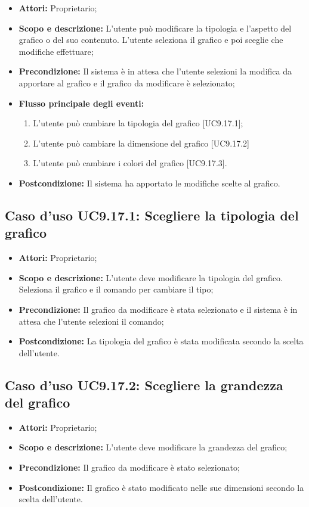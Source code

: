 	\begin{itemize}
		\item \textbf{Attori:} Proprietario;
		\item \textbf{Scopo e descrizione:} L'utente può modificare la tipologia e l'aspetto del grafico o del suo contenuto. L'utente seleziona il grafico e poi sceglie che modifiche effettuare;
		\item \textbf{Precondizione:} Il sistema è in attesa che l'utente selezioni la modifica da apportare al grafico e il grafico da modificare è selezionato;
		\item \textbf{Flusso principale degli eventi:}
		\begin{enumerate}
			\item L'utente può cambiare la tipologia del grafico [UC9.17.1];
			\item L'utente può cambiare la dimensione del grafico [UC9.17.2]
			\item L'utente può cambiare i colori del grafico [UC9.17.3].
		\end{enumerate}
		\item \textbf{Postcondizione:} Il sistema ha apportato le modifiche scelte al grafico.
	\end{itemize}

		\subsection{Caso d'uso UC9.17.1: Scegliere la tipologia del grafico}
		\begin{itemize}
			\item \textbf{Attori:} Proprietario;
			\item \textbf{Scopo e descrizione:} L'utente deve modificare la tipologia del grafico. Seleziona il grafico e il comando per cambiare il tipo;
			\item \textbf{Precondizione:} Il grafico da modificare è stata selezionato e il sistema è in attesa che l'utente selezioni il comando;
			\item \textbf{Postcondizione:} La tipologia del grafico è stata modificata secondo la scelta dell'utente.
		\end{itemize}
		
		\subsection{Caso d'uso UC9.17.2: Scegliere la grandezza del grafico}
		\begin{itemize}
			\item \textbf{Attori:} Proprietario;
			\item \textbf{Scopo e descrizione:} L'utente deve modificare la grandezza del grafico;
			\item \textbf{Precondizione:} Il grafico da modificare è stato selezionato;
			\item \textbf{Postcondizione:} Il grafico è stato modificato nelle sue dimensioni secondo la scelta dell'utente.
		\end{itemize}
		

